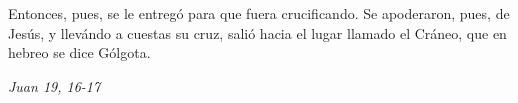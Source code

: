 \documentclass[../../devocionario.tex]{subfiles}
\begin{document}
    Entonces, pues, se le entregó para que fuera crucificando. Se apoderaron, pues, de Jesús, 
    y llevándo a cuestas su cruz, salió hacia el lugar llamado el Cráneo, que en hebreo se dice Gólgota.     

    \begin{flushright}
        \textit{Juan 19, 16-17}
    \end{flushright}
\end{document}
